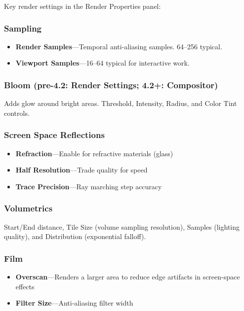 Key render settings in the Render Properties panel:

\subsubsection{Sampling}
\begin{itemize}[leftmargin=2em]
  \item \textbf{Render Samples}---Temporal anti-aliasing samples.
        64--256 typical.
  \item \textbf{Viewport Samples}---16--64 typical for interactive work.
\end{itemize}

\subsubsection{Bloom (pre-4.2: Render Settings; 4.2+: Compositor)}
Adds glow around bright areas. Threshold, Intensity, Radius, and
Color Tint controls.

\subsubsection{Screen Space Reflections}
\begin{itemize}[leftmargin=2em]
  \item \textbf{Refraction}---Enable for refractive materials (glass)
  \item \textbf{Half Resolution}---Trade quality for speed
  \item \textbf{Trace Precision}---Ray marching step accuracy
\end{itemize}

\subsubsection{Volumetrics}
Start/End distance, Tile Size (volume sampling resolution), Samples
(lighting quality), and Distribution (exponential falloff).

\subsubsection{Film}
\begin{itemize}[leftmargin=2em]
  \item \textbf{Overscan}---Renders a larger area to reduce edge artifacts in screen-space effects
  \item \textbf{Filter Size}---Anti-aliasing filter width
\end{itemize}


